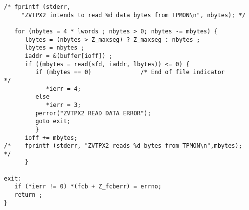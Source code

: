\begin{center}
\begin{verbatim}
/* fprintf (stderr,
     "ZVTPX2 intends to read %d data bytes from TPMON\n", nbytes); */

   for (nbytes = 4 * lwords ; nbytes > 0; nbytes -= mbytes) {
      lbytes = (nbytes > Z_maxseg) ? Z_maxseg : nbytes ;
      lbytes = nbytes ;
      iaddr = &(buffer[ioff]) ;
      if ((mbytes = read(sfd, iaddr, lbytes)) <= 0) {
         if (mbytes == 0)              /* End of file indicator      */
            *ierr = 4;
         else
            *ierr = 3;
         perror("ZVTPX2 READ DATA ERROR");
         goto exit;
         }
      ioff += mbytes;
/*    fprintf (stderr, "ZVTPX2 reads %d bytes from TPMON\n",mbytes); */
      }

exit:
   if (*ierr != 0) *(fcb + Z_fcberr) = errno;
   return ;
}

\end{verbatim}
\end{center}

